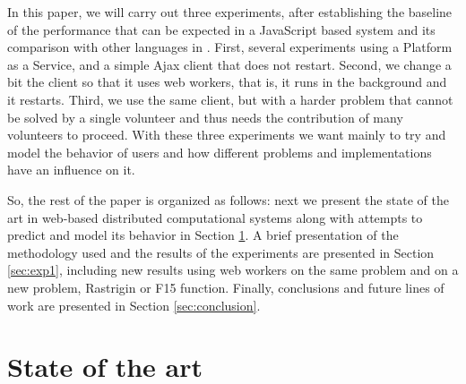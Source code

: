 \documentclass{sig-alternate}
\begin{document}
In this paper, we will carry out three experiments, after establishing
the baseline of the performance that can be expected in a JavaScript
based system and its comparison with other languages in
\cite{2016arXiv160101607Manom}. First, several experiments using a
Platform as a Service, and a simple Ajax client that does not
restart. Second, we change a bit the client so that it uses web
workers, that is, it runs in the background and it restarts. Third, we use the same
client, but with a harder problem that cannot be solved by a single
volunteer and thus needs the contribution of many volunteers to
proceed. With these three experiments we want mainly to try and model
the behavior of users and how different problems and implementations
have an influence on it. 

So, the rest of the paper is organized as follows: next we present the
state of the art in web-based distributed
computational systems along with attempts to predict and model its
behavior  in Section \ref{sec:soa}. A brief presentation of the
methodology used and the results of the experiments are presented in
Section \ref{sec:exp1}, including new results using web workers on the
same problem and on a new problem, Rastrigin or F15 function. 
Finally, conclusions and future lines of work are presented in Section
\ref{sec:conclusion}. 

\section{State of the art}
\label{sec:soa}
\end{document}
